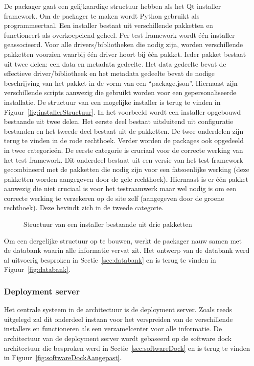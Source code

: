 De packager gaat een gelijkaardige structuur hebben als het Qt installer framework.
Om de packager te maken wordt Python gebruikt als programmeertaal.
Een installer bestaat uit verschillende pakketten en functioneert als overkoepelend geheel.
Per test framework wordt één installer geassocieerd.
Voor alle drivers/bibliotheken die nodig zijn, worden verschillende pakketten voorzien waarbij één driver hoort bij één pakket.
Ieder pakket bestaat uit twee delen: een data en metadata gedeelte.
Het data gedeelte bevat de effectieve driver/bibliotheek en het metadata gedeelte bevat de nodige beschrijving van het pakket in de vorm van een ``package.json''.
Hiernaast zijn verschillende scripts aanwezig die gebruikt worden voor een gepersonaliseerde installatie.
De structuur van een mogelijke installer is terug te vinden in Figuur~\vref{fig:installerStructuur}.
In het voorbeeld wordt een installer opgebouwd bestaande uit twee delen.
Het eerste deel bestaat uitsluitend uit configuratie bestanden en het tweede deel bestaat uit de pakketten.
De twee onderdelen zijn terug te vinden in de rode rechthoek.
Verder worden de packages ook opgedeeld in twee categorieën.
De eerste categorie is cruciaal voor de correcte werking van het test framework.
Dit onderdeel bestaat uit een versie van het test framework gecombineerd met de pakketten die nodig zijn voor een fatsoenlijke werking (deze pakketten worden aangegeven door de gele rechthoek).
Hiernaast is er één pakket aanwezig die niet cruciaal is voor het testraamwerk maar wel nodig is om een correcte werking te verzekeren op de site zelf (aangegeven door de groene rechthoek).
Deze bevindt zich in de tweede categorie.

\begin{figure}[!ht]
\centering
{}
\caption{Structuur van een installer bestaande uit drie pakketten}
\label{fig:installerStructuur}
\end{figure}

Om een dergelijke structuur op te bouwen, werkt de packager nauw samen met de databank waarin alle informatie vervat zit.
Het ontwerp van de databank werd al uitvoerig besproken in Sectie~\ref{sec:databank} en is terug te vinden in Figuur~\ref{fig:databank}.

\subsubsection{Deployment server}
Het centrale systeem in de architectuur is de deployment server.
Zoals reeds uitgelegd zal dit onderdeel instaan voor het verspreiden van de verschillende installers en functioneren als een verzamelcenter voor alle informatie.
De architectuur van de deployment server wordt gebaseerd op de software dock architectuur die besproken werd in Sectie~\vref{sec:softwareDock} en is terug te vinden in Figuur~\vref{fig:softwareDockAangepast}.


